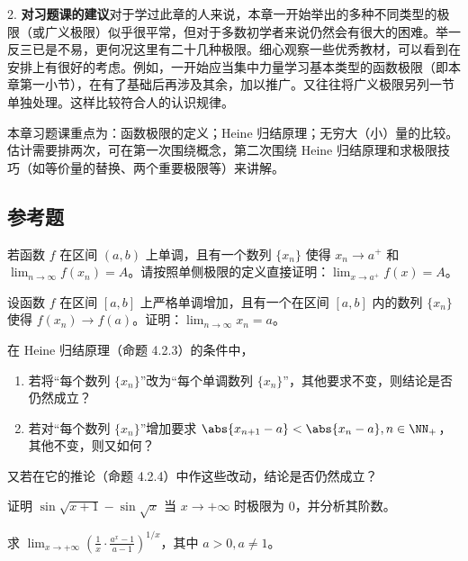 2. \textbf{对习题课的建议}\quad 对于学过此章的人来说，本章一开始举出的多种不同类型的极限（或广义极限）似乎很平常，但对于多数初学者来说仍然会有很大的困难。举一反三已是不易，更何况这里有二十几种极限。细心观察一些优秀教材，可以看到在安排上有很好的考虑。例如，一开始应当集中力量学习基本类型的函数极限（即本章第一小节），在有了基础后再涉及其余，加以推广。又往往将广义极限另列一节单独处理。这样比较符合人的认识规律。

本章习题课重点为：函数极限的定义；Heine 归结原理；无穷大（小）量的比较。估计需要排两次，可在第一次围绕概念，第二次围绕 Heine 归结原理和求极限技巧（如等价量的替换、两个重要极限等）来讲解。

\subsection{参考题}

\begin{xreferenceproblem}[1]
若函数 $f$ 在区间 $(a,b)$ 上单调，且有一个数列 $\{x_n\}$ 使得 $x_n\to a^+$ 和 $\lim_{n\to\infty}f(x_n)=A$。请按照单侧极限的定义直接证明：$\lim_{x\to a^+}f(x)=A$。
\end{xreferenceproblem}

\begin{xreferenceproblem}[2]
设函数 $f$ 在区间 $[a,b]$ 上严格单调增加，且有一个在区间 $[a,b]$ 内的数列 $\{x_n\}$ 使得 $f(x_n)\to f(a)$。证明：$\lim_{n\to\infty}x_n=a$。
\end{xreferenceproblem}

\begin{xreferenceproblem}[3]
在 Heine 归结原理（命题 4.2.3）的条件中，
  \begin{enumerate}
    \item 若将“每个数列 $\{x_n\}$”改为“每个单调数列 $\{x_n\}$”，其他要求不变，则结论是否仍然成立？
    \item 若对“每个数列 $\{x_n\}$”增加要求 $\abs{x_{n+1}-a}<\abs{x_n-a},n\in\NN_+$，其他不变，则又如何？
  \end{enumerate}
  又若在它的推论（命题 4.2.4）中作这些改动，结论是否仍然成立？
\end{xreferenceproblem}

\begin{xreferenceproblem}[4]
证明 $\sin\sqrt{x+1}-\sin\sqrt{x}$ 当 $x\to+\infty$ 时极限为 0，并分析其阶数。
\end{xreferenceproblem}

\begin{xreferenceproblem}[5]
求 $\displaystyle\lim_{x\to+\infty}\left(\frac1x\cdot\frac{a^x-1}{a-1}\right)^{1/x}$，其中 $a>0,a\ne1$。
\end{xreferenceproblem}

